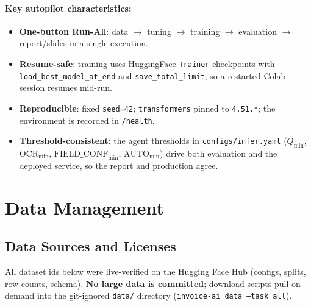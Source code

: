 \documentclass[12pt,a4paper]{article}
\begin{document}
\paragraph{Key autopilot characteristics:}
\begin{itemize}\setlength\itemsep{0.15em}
  \item \textbf{One-button Run-All}: data $\to$ tuning $\to$ training $\to$ evaluation $\to$ report/slides in a single execution.
  \item \textbf{Resume-safe}: training uses HuggingFace \texttt{Trainer} checkpoints with \texttt{load\_best\_model\_at\_end} and \texttt{save\_total\_limit}, so a restarted Colab session resumes mid-run.
  \item \textbf{Reproducible}: fixed \texttt{seed=42}; \texttt{transformers} pinned to \texttt{4.51.*}; the environment is recorded in \texttt{/health}.
  \item \textbf{Threshold-consistent}: the agent thresholds in \texttt{configs/infer.yaml} ($Q_{\min}$, $\text{OCR}_{\min}$, $\text{FIELD\_CONF}_{\min}$, $\text{AUTO}_{\min}$) drive both evaluation and the deployed service, so the report and production agree.
\end{itemize}

\section{Data Management}

\subsection{Data Sources and Licenses}

All dataset ids below were live-verified on the Hugging Face Hub (configs, splits, row
counts, schema). \textbf{No large data is committed}; download scripts pull on demand
into the git-ignored \texttt{data/} directory (\texttt{invoice-ai data --task all}).
\end{document}
